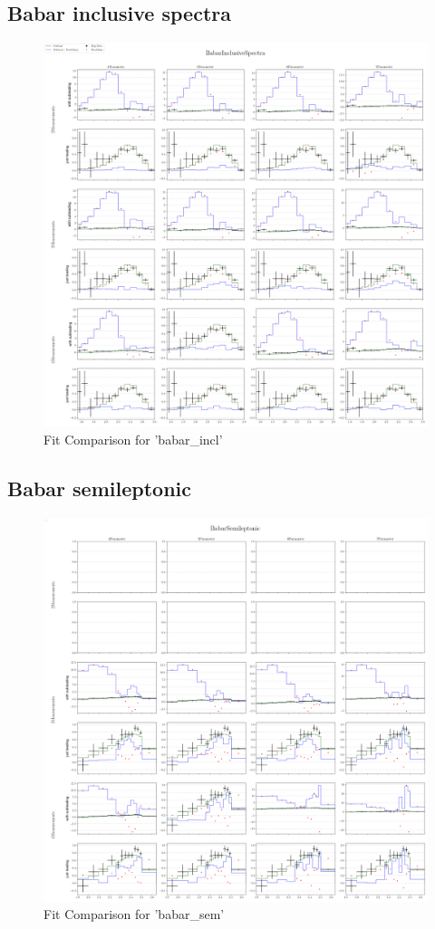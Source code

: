 \documentclass[a4paper,12pt]{article}
\begin{document}
\subsection{Babar inclusive spectra}
\begin{figure}[H]
    \centering
    \includegraphics[scale=0.3]{../compare/babar_incl_soft_compare.png}
    \caption{Fit Comparison for 'babar\_incl'}
\end{figure}
\subsection{Babar semileptonic}
\begin{figure}[H]
    \centering
    \includegraphics[scale=0.3]{../compare/babar_sem_soft_compare.png}
    \caption{Fit Comparison for 'babar\_sem'}
\end{figure}
\end{document}
